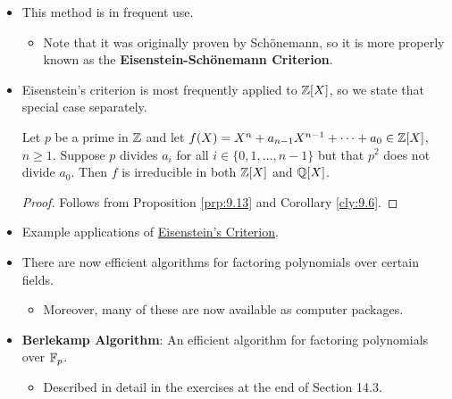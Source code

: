 \documentclass[../notes.tex]{subfiles}
\begin{document}
\begin{itemize}
\begin{proposition}
        \begin{proof}
            Given.
        \end{proof}
    \end{proposition}
    \item This method is in frequent use.
    \begin{itemize}
        \item Note that it was originally proven by Sch\"{o}nemann, so it is more properly known as the \textbf{Eisenstein-Sch\"{o}nemann Criterion}.
    \end{itemize}
    \item Eisenstein's criterion is most frequently applied to $\mathbb{Z}[X]$, so we state that special case separately.
    \begin{corollary}\label{cly:9.14}
        Let $p$ be a prime in $\mathbb{Z}$ and let $f(X)=X^n+a_{n-1}X^{n-1}+\cdots+a_0\in\mathbb{Z}[X]$, $n\geq 1$. Suppose $p$ divides $a_i$ for all $i\in\{0,1,\dots,n-1\}$ but that $p^2$ does not divide $a_0$. Then $f$ is irreducible in both $\mathbb{Z}[X]$ and $\mathbb{Q}[X]$.
        \begin{proof}
            Follows from Proposition \ref{prp:9.13} and Corollary \ref{cly:9.6}.
        \end{proof}
    \end{corollary}
    \item Example applications of \hyperref[prp:9.13]{Eisenstein's Criterion}.
    \item There are now efficient algorithms for factoring polynomials over certain fields.
    \begin{itemize}
        \item Moreover, many of these are now available as computer packages.
    \end{itemize}
    \item \textbf{Berlekamp Algorithm}: An efficient algorithm for factoring polynomials over $\mathbb{F}_p$.
    \begin{itemize}
        \item Described in detail in the exercises at the end of Section 14.3.
    \end{itemize}
\end{itemize}
\end{document}
